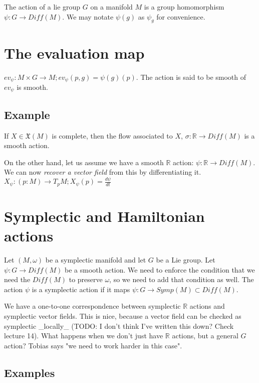 \documentclass[11pt]{book}
\newcommand{\R}{\ensuremath{\mathbb R}}
\newcommand{\vectorfield}{\ensuremath{\mathfrak{X}}}
\begin{document}
The action of a lie group $G$ on a manifold $M$ is a group
homomorphism $\psi : G \rightarrow Diff(M)$. We may notate
$\psi(g)$ as $\psi_g$ for convenience.

\section{The evaluation map}
$ev_\psi: M \times G \rightarrow M; ev_\psi(p, g) = \psi(g)(p)$.
The action is said to be smooth of $ev_\psi$ is smooth.

\subsection{Example}
If $X \in \vectorfield(M)$ is complete, then the flow associated to $X$,
$\sigma: \R \rightarrow Diff(M)$ is a smooth action.

On the other hand, let us assume we have a smooth $\R$ action: $\psi: \R \rightarrow Diff(M)$.
We can now \emph{recover a vector field} from this by differentiating it. 
$X_\psi : (p : M) \rightarrow T_p M; X_\psi(p) = \frac{d\psi}{dt}$

\section{Symplectic and Hamiltonian actions}

Let $(M, \omega)$ be a symplectic manifold and let $G$ be a Lie group.
Let $\psi: G \rightarrow Diff(M)$ be a smooth action. We need to enforce
the condition that we need the $Diff(M)$ to preserve $\omega$, so we need
to add that condition as well. The action $\psi$ is a symplectic action
if it maps $\psi: G \rightarrow Symp(M) \subset Diff(M)$.

We have a one-to-one correspondence between symplectic $\R$ actions and symplectic
vector fields. This is nice, because a vector field can be checked as symplectic
_locally_ (TODO: I don't think I've written this down? Check lecture 14). What
happens when we don't just have $\R$ actions, but a general $G$ action? Tobias
says "we need to work harder in this case".

\subsection{Examples}
\end{document}
